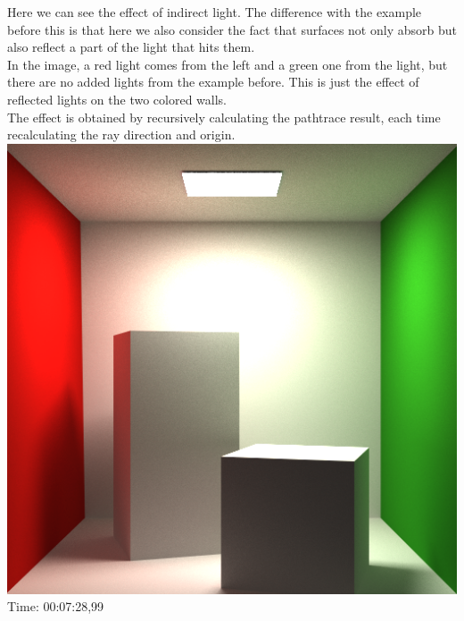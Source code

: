 \documentclass[12pt]{article} %
\begin{document}
Here we can see the effect of indirect light. The difference with the example before this is that here we also consider the fact that surfaces not only absorb but also reflect a part of the light that hits them.\\
In the image, a red light comes from the left and a green one from the light, but there are no added lights from the example before. This is just the effect of reflected lights on the two colored walls.\\
The effect is obtained by recursively calculating the pathtrace result, each time recalculating the ray direction and origin.\\
\includegraphics[width=\linewidth]{Homework4/tests/07_cb_indirect.png}
Time: 00:07:28,99
\end{document}
